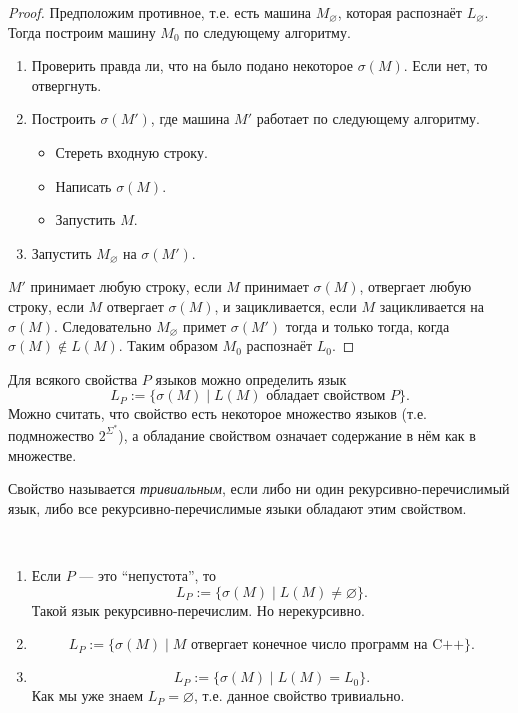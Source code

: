 \documentclass[12pt,a4paper]{article}
\begin{document}
    \begin{proof}
        Предположим противное, т.е. есть машина $M_\varnothing$, которая распознаёт $L_\varnothing$. Тогда построим машину $M_0$ по следующему алгоритму.
        \begin{enumerate}
            \item Проверить правда ли, что на было подано некоторое $\sigma(M)$. Если нет, то отвергнуть.
            \item Построить $\sigma(M')$, где машина $M'$ работает по следующему алгоритму.
                \begin{itemize}
                    \item Стереть входную строку.
                    \item Написать $\sigma(M)$.
                    \item Запустить $M$.
                \end{itemize}
            \item Запустить $M_\varnothing$ на $\sigma(M')$.
        \end{enumerate}
        $M'$ принимает любую строку, если $M$ принимает $\sigma(M)$, отвергает любую строку, если $M$ отвергает $\sigma(M)$, и зацикливается, если $M$ зацикливается на $\sigma(M)$. Следовательно $M_\varnothing$ примет $\sigma(M')$ тогда и только тогда, когда $\sigma(M) \notin L(M)$. Таким образом $M_0$ распознаёт $L_0$.
    \end{proof}

    \begin{definition}
        Для всякого свойства $P$ языков можно определить язык
        \[L_P := \{\sigma(M) \mid \text{$L(M)$ обладает свойством $P$}\}.\]
        Можно считать, что свойство есть некоторое множество языков (т.е. подмножество $2^{\Sigma^*}$), а обладание свойством означает содержание в нём как в множестве.

        Свойство называется \emph{тривиальным}, если либо ни один рекурсивно-перечислимый язык, либо все рекурсивно-перечислимые языки обладают этим свойством.
    \end{definition}

    \begin{example}\ 
        \begin{enumerate}
            \item Если $P$ --- это ``непустота'', то
                \[L_P := \{\sigma(M) \mid L(M) \neq \varnothing\}.\]
                Такой язык рекурсивно-перечислим. Но нерекурсивно.
            \item
                \[L_P := \{\sigma(M) \mid \text{$M$ отвергает конечное число программ на C++}\}.\]
            \item
                \[L_P := \{\sigma(M) \mid L(M) = L_0\}.\]
                Как мы уже знаем $L_P = \varnothing$, т.е. данное свойство тривиально.
        \end{enumerate}
    \end{example}
\end{document}
